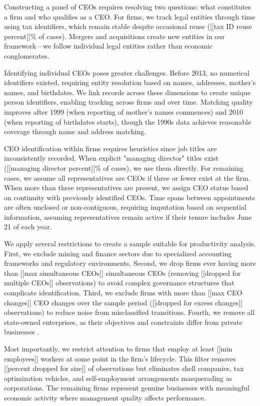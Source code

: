 \documentclass[11pt,a4paper]{article}
\begin{document}
Constructing a panel of CEOs requires resolving two questions: what constitutes a firm and who qualifies as a CEO. For firms, we track legal entities through time using tax identifiers, which remain stable despite occasional reuse ([[tax ID reuse percent]]\% of cases). Mergers and acquisitions create new entities in our framework—we follow individual legal entities rather than economic conglomerates.

Identifying individual CEOs poses greater challenges. Before 2013, no numerical identifiers existed, requiring entity resolution based on names, addresses, mother's names, and birthdates. We link records across these dimensions to create unique person identifiers, enabling tracking across firms and over time. Matching quality improves after 1999 (when reporting of mother's names commences) and 2010 (when reporting of birthdates starts), though the 1990s data achieves reasonable coverage through name and address matching. 

CEO identification within firms requires heuristics since job titles are inconsistently recorded. When explicit "managing director" titles exist ([[managing director percent]]\% of cases), we use them directly. For remaining cases, we assume all representatives are CEOs if three or fewer exist at the firm. When more than three representatives are present, we assign CEO status based on continuity with previously identified CEOs. Time spans between appointments are often unclosed or non-contiguous, requiring imputation based on sequential information, assuming representatives remain active if their tenure includes June 21 of each year.

We apply several restrictions to create a sample suitable for productivity analysis. First, we exclude mining and finance sectors due to specialized accounting frameworks and regulatory environments. Second, we drop firms ever having more than [[max simultaneous CEOs]] simultaneous CEOs (removing [[dropped for multiple CEOs]] observations) to avoid complex governance structures that complicate identification. Third, we exclude firms with more than [[max CEO changes]] CEO changes over the sample period ([[dropped for excess changes]] observations) to reduce noise from misclassified transitions. Fourth, we remove all state-owned enterprises, as their objectives and constraints differ from private businesses \citep{orban2019inception}.

Most importantly, we restrict attention to firms that employ at least [[min employees]] workers at some point in the firm's lifecycle. This filter removes [[percent dropped for size]] of observations but eliminates shell companies, tax optimization vehicles, and self-employment arrangements masquerading as corporations. The remaining firms represent genuine businesses with meaningful economic activity where management quality affects performance.
\end{document}
